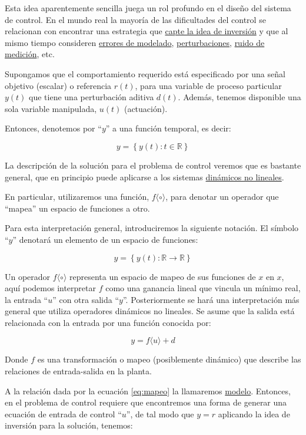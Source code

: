 \documentclass[a4paper]{article}
\begin{document}
Esta idea aparentemente sencilla juega un rol profundo en el diseño del sistema de control. En el mundo real la mayoría de las dificultades del control se relacionan con encontrar una estrategia que \underline{capte la idea de inversión} y que al mismo tiempo consideren \underline{errores de modelado}, \underline{perturbaciones}, \underline{ruido de medición}, etc.

Supongamos que el comportamiento requerido está especificado por una señal objetivo (escalar) o referencia $r(t)$, para una variable de proceso particular $y(t)$ que tiene una perturbación aditiva $d(t)$. Además, tenemos disponible una sola variable manipulada, $u(t)$ (actuación).

Entonces, denotemos por ``$y$'' a una función temporal, es decir:

\[
		y = \left\{y(t) : t \in \mathbb{R}  \right\}
\]

La descripción de la solución para el problema de control veremos que es bastante general, que en principio puede aplicarse a los sistemas \underline{dinámicos no lineales}.

En particular, utilizaremos una función, $f\langle \circ \rangle$, para denotar un operador que ``mapea'' un espacio de funciones a otro.

Para esta interpretación general, introduciremos la siguiente notación. El símbolo ``$y$'' denotará un elemento de un espacio de funciones:

\[
		y = \left\{ y (t) : \mathbb{R} \to \mathbb{R}  \right\}
\]

Un operador $f\langle \circ \rangle $ representa un espacio de mapeo de sus funciones de $x$ en $x$, aquí podemos interpretar $f$ como una ganancia lineal que vincula un mínimo real, la entrada ``$u$'' con otra salida ``$y$''. Posteriormente se hará una interpretación más general que utiliza operadores dinámicos no lineales. Se asume que la salida está relacionada con la entrada por una función conocida por:

\begin{equation}\label{eq:mapeo}
		y = f\langle u \rangle + d
\end{equation}

Donde $f$ es una transformación o mapeo (posiblemente dinámico) que describe las relaciones de entrada-salida en la planta.

A la relación dada por la ecuación \ref{eq:mapeo} la llamaremos \underline{modelo}. Entonces, en el problema de control requiere que encontremos una forma de generar una ecuación de entrada de control ``$u$'', de tal modo que $y = r$ aplicando la idea de inversión para la solución, tenemos:
\end{document}
